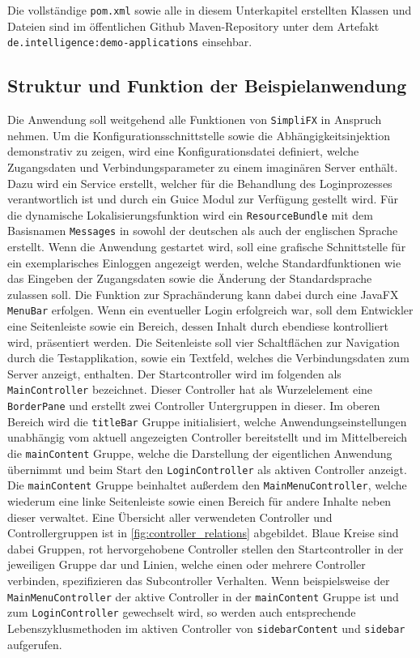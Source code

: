 Die vollständige \texttt{pom.xml} sowie alle in diesem Unterkapitel erstellten Klassen und Dateien sind im öffentlichen Github Maven-Repository unter dem Artefakt \texttt{de.intelligence:demo-applications} einsehbar.
\subsection{Struktur und Funktion der Beispielanwendung}
Die Anwendung soll weitgehend alle Funktionen von \texttt{SimpliFX} in Anspruch nehmen. Um die Konfigurationsschnittstelle sowie die Abhängigkeitsinjektion demonstrativ zu zeigen, wird eine Konfigurationsdatei definiert, welche Zugangsdaten und Verbindungsparameter zu einem imaginären Server enthält. Dazu wird ein Service erstellt, welcher für die Behandlung des Loginprozesses verantwortlich ist und durch ein Guice Modul zur Verfügung gestellt wird. Für die dynamische Lokalisierungsfunktion wird ein \texttt{ResourceBundle} mit dem Basisnamen \texttt{Messages} in sowohl der deutschen als auch der englischen Sprache erstellt. Wenn die Anwendung gestartet wird, soll eine grafische Schnittstelle für ein exemplarisches Einloggen angezeigt werden, welche Standardfunktionen wie das Eingeben der Zugangsdaten sowie die Änderung der Standardsprache zulassen soll. Die Funktion zur Sprachänderung kann dabei durch eine JavaFX \texttt{MenuBar} erfolgen. Wenn ein eventueller Login erfolgreich war, soll dem Entwickler eine Seitenleiste sowie ein Bereich, dessen Inhalt durch ebendiese kontrolliert wird, präsentiert werden. Die Seitenleiste soll vier Schaltflächen zur Navigation durch die Testapplikation, sowie ein Textfeld, welches die Verbindungsdaten zum Server anzeigt, enthalten. Der Startcontroller wird im folgenden als \texttt{MainController} bezeichnet. 
Dieser Controller hat als Wurzelelement eine \texttt{BorderPane} und erstellt zwei Controller Untergruppen in dieser. Im oberen Bereich wird die \texttt{titleBar} Gruppe initialisiert, welche Anwendungseinstellungen unabhängig vom aktuell angezeigten Controller bereitstellt und im Mittelbereich die \texttt{mainContent} Gruppe, welche die Darstellung der eigentlichen Anwendung übernimmt und beim Start den \texttt{LoginController} als aktiven Controller anzeigt. Die \texttt{mainContent} Gruppe beinhaltet außerdem den \texttt{MainMenuController}, welche wiederum eine linke Seitenleiste sowie einen Bereich für andere Inhalte neben dieser verwaltet. Eine Übersicht aller verwendeten Controller und Controllergruppen ist in \autoref{fig:controller_relations} abgebildet. Blaue Kreise sind dabei Gruppen, rot hervorgehobene Controller stellen den Startcontroller in der jeweiligen Gruppe dar und Linien, welche einen oder mehrere Controller verbinden, spezifizieren das Subcontroller Verhalten. Wenn beispielsweise der \texttt{MainMenuController} der aktive Controller in der \texttt{mainContent} Gruppe ist und zum \texttt{LoginController} gewechselt wird, so werden auch entsprechende Lebenszyklusmethoden im aktiven Controller von \texttt{sidebarContent} und \texttt{sidebar} aufgerufen.

